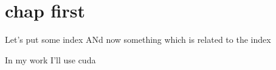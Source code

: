 \documentclass[
	10pt,
	twoside,
]{scrbook}
\title{}
\subtitle{}
\author{
  
}
\date{}
\begin{document}
%
\frontmatter
{}
	\maketitle
	\thispagestyle{empty}

	\cleardoublepage
{}
	\tableofcontents

	

%
\mainmatter
\chapter{chap first}
\lipsum


Let's put some index
ANd now something which is related to the index




In my work I'll use \gls{cuda}

%
\backmatter
	\printnoidxglossaries

	\cleardoublepage
	\printindex

	\cleardoublepage
	\nocite{*}
	\printbibliography
\end{document}
